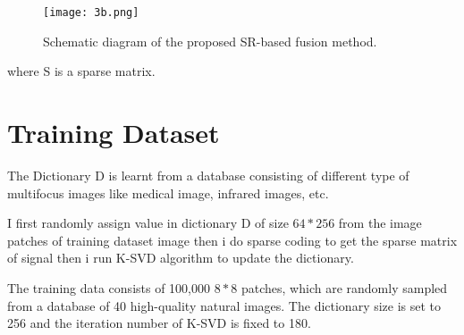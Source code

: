 \begin{figure}[h]
  \centering
  \texttt{[image: 3b.png]}
  \label{figsr}
  \caption{Schematic diagram of the proposed SR-based fusion method.}
\end{figure}

where S is a sparse matrix.

\section{Training Dataset}
The Dictionary D is learnt from a database consisting of different type of multifocus images like medical image, infrared images, etc.
\hfill \break

I first randomly assign value in dictionary D of size \(64*256 \) from the image patches of training dataset image then i do sparse coding to get the sparse matrix of signal then i run K-SVD algorithm to update the dictionary.
\hfill \break

The training data consists of 100,000 \(8*8\)
patches, which are randomly sampled from a database of 40
high-quality natural images. The dictionary size is set to 256 and
the iteration number of K-SVD is fixed to 180.








